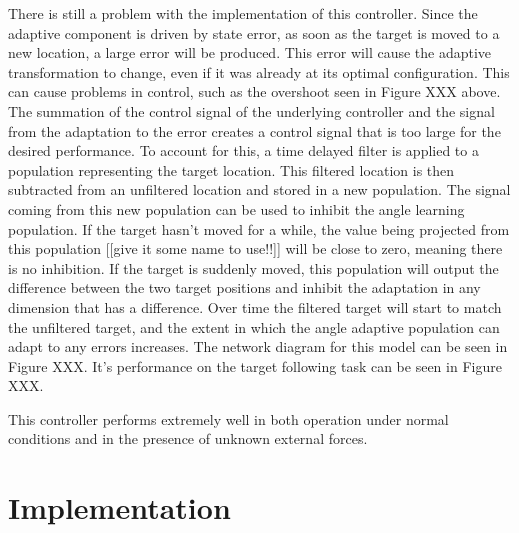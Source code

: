 \documentclass[letterpaper,12pt,titlepage,oneside,final]{book}
\begin{document}

There is still a problem with the implementation of this controller. 
Since the adaptive component is driven by state error, as soon as the target is moved to a new location, a large error will be produced. 
This error will cause the adaptive transformation to change, even if it was already at its optimal configuration. 
This can cause problems in control, such as the overshoot seen in Figure XXX above. 
The summation of the control signal of the underlying controller and the signal from the adaptation to the error creates a control signal that is too large for the desired performance. 
To account for this, a time delayed filter is applied to a population representing the target location. 
This filtered location is then subtracted from an unfiltered location and stored in a new population. The signal coming from this new population can be used to inhibit the angle learning population. 
If the target hasn’t moved for a while, the value being projected from this population [[give it some name to use!!]] will be close to zero, meaning there is no inhibition. 
If the target is suddenly moved, this population will output the difference between the two target positions and inhibit the adaptation in any dimension that has a difference. 
Over time the filtered target will start to match the unfiltered target, and the extent in which the angle adaptive population can adapt to any errors increases. 
The network diagram for this model can be seen in Figure XXX. It’s performance on the target following task can be seen in Figure XXX.


This controller performs extremely well in both operation under normal conditions and in the presence of unknown external forces.

\section{Implementation}

\end{document}
